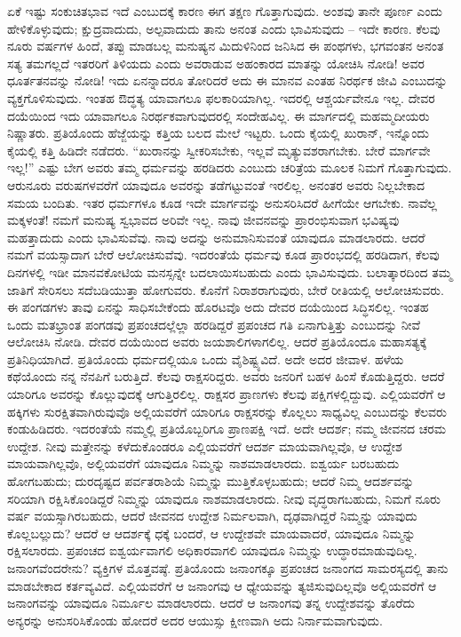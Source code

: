 
ಏಕೆ ಇಷ್ಟು ಸಂಕುಚಿತಭಾವ ಇದೆ ಎಂಬುದಕ್ಕೆ ಕಾರಣ ಈಗ ತಕ್ಷಣ ಗೊತ್ತಾಗುವುದು. ಅಂಶವು ತಾನೇ ಪೂರ್ಣ ಎಂದು ಹೇಳಿಕೊಳ್ಳುವುದು; ಕ್ಷುದ್ರವಾದುದು, ಅಲ್ಪವಾದುದು ತಾನು ಅನಂತ ಎಂದು ಭಾವಿಸುವುದು – ಇದೇ ಕಾರಣ. ಕೆಲವು ನೂರು ವರ್ಷಗಳ ಹಿಂದೆ, ತಪ್ಪು ಮಾಡಬಲ್ಲ ಮನುಷ್ಯನ ಮಿದುಳಿನಿಂದ ಜನಿಸಿದ ಈ ಪಂಥಗಳು, ಭಗವಂತನ ಅನಂತ ಸತ್ಯ ತಮಗಲ್ಲದೆ ಇತರರಿಗೆ ತಿಳಿಯದು ಎಂದು ಅವರಾಡುವ ಅಹಂಕಾರದ ಮಾತನ್ನು ಯೋಚಿಸಿ ನೋಡಿ! ಅವರ ಧೂರ್ತತನವನ್ನು ನೋಡಿ! ಇದು ಏನನ್ನಾದರೂ ತೋರಿದರೆ ಅದು ಈ ಮಾನವ ಎಂತಹ ನಿರರ್ಥಕ ಜೀವಿ ಎಂಬುದನ್ನು ವ್ಯಕ್ತಗೊಳಿಸುವುದು. ಇಂತಹ ಔದ್ಧತ್ಯ ಯಾವಾಗಲೂ ಫಲಕಾರಿಯಾಗಿಲ್ಲ. ಇದರಲ್ಲಿ ಆಶ್ಚರ್ಯವೇನೂ ಇಲ್ಲ. ದೇವರ ದಯೆಯಿಂದ ಇದು ಯಾವಾಗಲೂ ನಿರರ್ಥಕವಾಗುವುದರಲ್ಲಿ ಸಂದೇಹವಿಲ್ಲ. ಈ ಮಾರ್ಗದಲ್ಲಿ ಮಹಮ್ಮದೀಯರು ನಿಷ್ಣಾತರು. ಪ್ರತಿಯೊಂದು ಹೆಜ್ಜೆಯನ್ನು ಕತ್ತಿಯ ಬಲದ ಮೇಲೆ ಇಟ್ಟರು. ಒಂದು ಕೈಯಲ್ಲಿ ಖುರಾನ್​, ಇನ್ನೊಂದು ಕೈಯಲ್ಲಿ ಕತ್ತಿ ಹಿಡಿದೇ ನಡೆದರು. “ಖುರಾನನ್ನು ಸ್ವೀಕರಿಸಬೇಕು, ಇಲ್ಲವೆ ಮೃತ್ಯುವಶರಾಗಬೇಕು. ಬೇರೆ ಮಾರ್ಗವೇ ಇಲ್ಲ!” ಎಷ್ಟು ಬೇಗ ಅವರು ತಮ್ಮ ಧರ್ಮವನ್ನು ಹರಡಿದರು ಎಂಬುದು ಚರಿತ್ರೆಯ ಮೂಲಕ ನಿಮಗೆ ಗೊತ್ತಾಗುವುದು. ಆರುನೂರು ವರುಷಗಳವರೆಗೆ ಯಾವುದೂ ಅವರನ್ನು ತಡೆಗಟ್ಟುವಂತೆ ಇರಲಿಲ್ಲ. ಅನಂತರ ಅವರು ನಿಲ್ಲಬೇಕಾದ ಸಮಯ ಬಂದಿತು. ಇತರ ಧರ್ಮಗಳೂ ಕೂಡ ಇದೇ ಮಾರ್ಗವನ್ನು ಅನುಸರಿಸಿದರೆ ಹೀಗೆಯೇ ಆಗಬೇಕು. ನಾವೆಲ್ಲ ಮಕ್ಕಳಂತೆ! ನಮಗೆ ಮನುಷ್ಯ ಸ್ವಭಾವದ ಅರಿವೇ ಇಲ್ಲ. ನಾವು ಜೀವನವನ್ನು ಪ್ರಾರಂಭಿಸುವಾಗ ಭವಿಷ್ಯವು ಮಹತ್ತಾದುದು ಎಂದು ಭಾವಿಸುವೆವು. ನಾವು ಅದನ್ನು ಅನುಮಾನಿಸುವಂತೆ ಯಾವುದೂ ಮಾಡಲಾರದು. ಆದರೆ ನಮಗೆ ವಯಸ್ಸಾದಾಗ ಬೇರೆ ಆಲೋಚಿಸುವೆವು. ಇದರಂತೆಯೆ ಧರ್ಮವು ಕೂಡ ಪ್ರಾರಂಭದಲ್ಲಿ ಹರಡಿದಾಗ, ಕೆಲವು ದಿನಗಳಲ್ಲಿ ಇಡೀ ಮಾನವಕೋಟಿಯ ಮನಸ್ಸನ್ನೇ ಬದಲಾಯಿಸಬಹುದು ಎಂದು ಭಾವಿಸುವುದು. ಬಲಾತ್ಕಾರದಿಂದ ತಮ್ಮ ಜಾತಿಗೆ ಸೇರಿಸಲು ಸದೆಬಡಿಯುತ್ತಾ ಹೋಗುವರು. ಕೊನೆಗೆ ನಿರಾಶರಾಗುವುರು, ಬೇರೆ ರೀತಿಯಲ್ಲಿ ಆಲೋಚಿಸುವರು. ಈ ಪಂಗಡಗಳು ತಾವು ಏನನ್ನು ಸಾಧಿಸಬೇಕೆಂದು ಹೊರಟವೊ ಅದು ದೇವರ ದಯೆಯಿಂದ ಸಿದ್ಧಿಸಲಿಲ್ಲ. ಇಂತಹ ಒಂದು ಮತಭ್ರಾಂತ ಪಂಗಡವು ಪ್ರಪಂಚದಲ್ಲೆಲ್ಲಾ ಹರಡಿದ್ದರೆ ಪ್ರಪಂಚದ ಗತಿ ಏನಾಗುತ್ತಿತ್ತು ಎಂಬುದನ್ನು ನೀವೆ ಆಲೋಚಿಸಿ ನೋಡಿ. ದೇವರ ದಯೆಯಿಂದ ಅವರು ಜಯಶಾಲಿಗಳಾಗಲಿಲ್ಲ. ಆದರೆ ಪ್ರತಿಯೊಂದೂ ಮಹಾಸತ್ಯಕ್ಕೆ ಪ್ರತಿನಿಧಿಯಾಗಿದೆ. ಪ್ರತಿಯೊಂದು ಧರ್ಮದಲ್ಲಿಯೂ ಒಂದು ವೈಶಿಷ್ಟ್ಯವಿದೆ. ಅದೇ ಅದರ ಜೀವಾಳ. ಹಳೆಯ ಕಥೆಯೊಂದು ನನ್ನ ನೆನಪಿಗೆ ಬರುತ್ತಿದೆ. ಕೆಲವು ರಾಕ್ಷಸರಿದ್ದರು. ಅವರು ಜನರಿಗೆ ಬಹಳ ಹಿಂಸೆ ಕೊಡುತ್ತಿದ್ದರು. ಆದರೆ ಯಾರಿಗೂ ಅವರನ್ನು ಕೊಲ್ಲುವುದಕ್ಕೆ ಆಗುತ್ತಿರಲಿಲ್ಲ. ರಾಕ್ಷಸರ ಪ್ರಾಣಗಳು ಕೆಲವು ಪಕ್ಷಿಗಳಲ್ಲಿದ್ದುವು. ಎಲ್ಲಿಯವರೆಗೆ ಆ ಹಕ್ಕಿಗಳು ಸುರಕ್ಷಿತವಾಗಿರುವುವೊ ಅಲ್ಲಿಯವರೆಗೆ ಯಾರಿಗೂ ರಾಕ್ಷಸರನ್ನು ಕೊಲ್ಲಲು ಸಾಧ್ಯವಿಲ್ಲ ಎಂಬುದನ್ನು ಕೆಲವರು ಕಂಡುಹಿಡಿದರು. ಇದರಂತೆಯೆ ನಮ್ಮಲ್ಲಿ ಪ್ರತಿಯೊಬ್ಬರಿಗೂ ಪ್ರಾಣಪಕ್ಷಿ ಇದೆ. ಅದೇ ಆದರ್ಶ; ನಮ್ಮ ಜೀವನದ ಚರಮ ಉದ್ದೇಶ. ನೀವು ಮತ್ತೇನನ್ನು ಕಳೆದುಕೊಂಡರೂ ಎಲ್ಲಿಯವರೆಗೆ ಆದರ್ಶ ಮಾಯವಾಗಿಲ್ಲವೊ, ಆ ಉದ್ದೇಶ ಮಾಯವಾಗಿಲ್ಲವೊ, ಅಲ್ಲಿಯವರೆಗೆ ಯಾವುದೂ ನಿಮ್ಮನ್ನು ನಾಶಮಾಡಲಾರದು. ಐಶ್ವರ್ಯ ಬರಬಹುದು ಹೋಗಬಹುದು; ದುರದೃಷ್ಟದ ಪರ್ವತರಾಶಿಯೆ ನಿಮ್ಮನ್ನು ಮುತ್ತಿಕೊಳ್ಳಬಹುದು; ಆದರೆ ನಿಮ್ಮ ಆದರ್ಶವನ್ನು ಸರಿಯಾಗಿ ರಕ್ಷಿಸಿಕೊಂಡಿದ್ದರೆ ನಿಮ್ಮನ್ನು ಯಾವುದೂ ನಾಶಮಾಡಲಾರದು. ನೀವು ವೃದ್ಧರಾಗಬಹುದು, ನಿಮಗೆ ನೂರು ವರ್ಷ ವಯಸ್ಸಾಗಿರಬಹುದು, ಆದರೆ ಜೀವನದ ಉದ್ದೇಶ ನಿರ್ಮಲವಾಗಿ, ದೃಢವಾಗಿದ್ದರೆ ನಿಮ್ಮನ್ನು ಯಾವುದು ಕೊಲ್ಲಬಲ್ಲುದು? ಆದರೆ ಆ ಆದರ್ಶಕ್ಕೆ ಧಕ್ಕೆ ಬಂದರೆ, ಆ ಉದ್ದೇಶವೇ ಮಾಯವಾದರೆ, ಯಾವುದೂ ನಿಮ್ಮನ್ನು ರಕ್ಷಿಸಲಾರದು. ಪ್ರಪಂಚದ ಐಶ್ವರ್ಯವಾಗಲಿ ಅಧಿಕಾರವಾಗಲಿ ಯಾವುದೂ ನಿಮ್ಮನ್ನು ಉದ್ಧಾರಮಾಡುವುದಿಲ್ಲ. ಜನಾಂಗವೆಂದರೇನು? ವ್ಯಕ್ತಿಗಳ ಮೊತ್ತವಷ್ಠೆ. ಪ್ರತಿಯೊಂದು ಜನಾಂಗಕ್ಕೂ ಪ್ರಪಂಚದ ಜನಾಂಗದ ಸಾಮರಸ್ಯದಲ್ಲಿ ತಾನು ಮಾಡಬೇಕಾದ ಕರ್ತವ್ಯವಿದೆ. ಎಲ್ಲಿಯವರೆಗೆ ಆ ಜನಾಂಗವು ಆ ಧ್ಯೇಯವನ್ನು ತ್ಯಜಿಸುವುದಿಲ್ಲವೊ ಅಲ್ಲಿಯವರೆಗೆ ಆ ಜನಾಂಗವನ್ನು ಯಾವುದೂ ನಿರ್ಮೂಲ ಮಾಡಲಾರದು. ಆದರೆ ಆ ಜನಾಂಗವು ತನ್ನ ಉದ್ದೇಶವನ್ನು ತೊರೆದು ಅನ್ಯರನ್ನು ಅನುಸರಿಸಿಕೊಂಡು ಹೋದರೆ ಅದರ ಆಯುಸ್ಸು ಕ್ಷೀಣವಾಗಿ ಅದು ನಿರ್ನಾಮವಾಗುವುದು.

